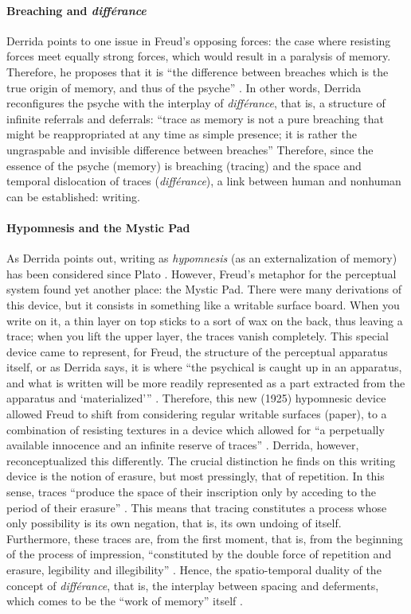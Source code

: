 \paragraph{Breaching and \textit{différance}}
Derrida points to one issue in Freud's opposing forces: the case where resisting forces meet equally strong forces, which would result in a paralysis of memory. Therefore, he proposes that it is ``the difference between breaches which is the true origin of memory, and thus of the psyche'' \parencite[201]{Der78:Wri}. In other words, Derrida reconfigures the psyche with the interplay of \textit{différance}, that is, a structure of infinite referrals and deferrals: ``trace as memory is not a pure breaching that might be reappropriated at any time as simple presence; it is rather the ungraspable and invisible difference between breaches'' \parencite[201]{Der78:Wri} Therefore, since the essence of the psyche (memory) is breaching (tracing) and the space and temporal dislocation of traces (\textit{différance}), a link between human and nonhuman can be established: writing. 

\paragraph{Hypomnesis and the Mystic Pad}
As Derrida points out, writing as \textit{hypomnesis} (as an externalization of memory) has been considered since Plato \parencite[221]{Der78:Wri}. However, Freud's metaphor for the perceptual system found yet another place: the Mystic Pad. There were many derivations of this device, but it consists in something like a writable surface board. When you write on it, a thin layer on top sticks to a sort of wax on the back, thus leaving a trace; when you lift the upper layer, the traces vanish completely. This special device came to represent, for Freud, the structure of the perceptual apparatus itself, or as Derrida says, it is where ``the psychical is caught up in an apparatus, and what is written will be more readily represented as a part extracted from the apparatus and `materialized''' \parencite[222]{Der78:Wri}. Therefore, this new (1925) hypomnesic device allowed Freud to shift from considering regular writable surfaces (paper), to a combination of resisting textures in a device which allowed for ``a perpetually available innocence and an infinite reserve of traces'' \parencite[223]{Der78:Wri}. Derrida, however, reconceptualized this differently. The crucial distinction he finds on this writing device is the notion of erasure, but most pressingly, that of repetition. In this sense, traces ``produce the space of their inscription only by acceding to the period of their erasure'' \parencite[226]{Der78:Wri}. This means that tracing constitutes a process whose only possibility is its own negation, that is, its own undoing of itself. Furthermore, these traces are, from the first moment, that is, from the beginning of the process of impression, ``constituted by the double force of repetition and erasure, legibility and illegibility'' \parencite[226]{Der78:Wri}. Hence, the spatio-temporal duality of the concept of \textit{différance}, that is, the interplay between spacing and deferments, which comes to be the ``work of memory'' itself \parencite[226]{Der78:Wri}.

